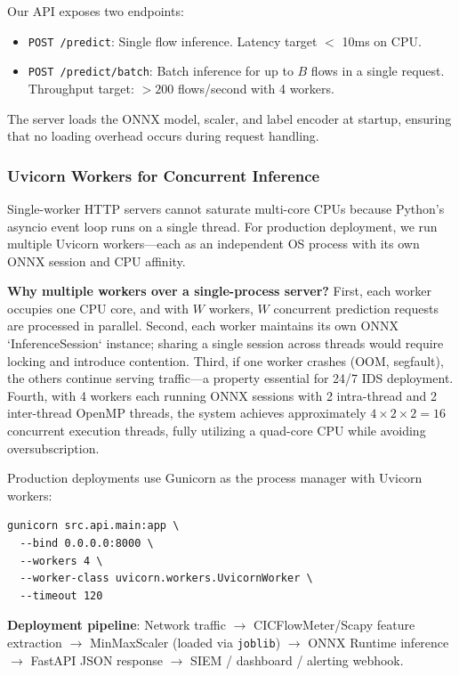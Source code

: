\documentclass[conference]{IEEEtran}
\begin{document}
Our API exposes two endpoints:
\begin{itemize}
    \item \texttt{POST /predict}: Single flow inference. Latency target $<$ 10ms on CPU.
    \item \texttt{POST /predict/batch}: Batch inference for up to $B$ flows in a single request. Throughput target: $>200$ flows/second with 4 workers.
\end{itemize}

The server loads the ONNX model, scaler, and label encoder at startup, ensuring that no loading overhead occurs during request handling.

\subsubsection{Uvicorn Workers for Concurrent Inference}

Single-worker HTTP servers cannot saturate multi-core CPUs because Python's asyncio event loop runs on a single thread. For production deployment, we run multiple Uvicorn workers---each as an independent OS process with its own ONNX session and CPU affinity.

\textbf{Why multiple workers over a single-process server?} First, each worker occupies one CPU core, and with $W$ workers, $W$ concurrent prediction requests are processed in parallel. Second, each worker maintains its own ONNX `InferenceSession` instance; sharing a single session across threads would require locking and introduce contention. Third, if one worker crashes (OOM, segfault), the others continue serving traffic---a property essential for 24/7 IDS deployment. Fourth, with 4 workers each running ONNX sessions with 2 intra-thread and 2 inter-thread OpenMP threads, the system achieves approximately $4 \times 2 \times 2 = 16$ concurrent execution threads, fully utilizing a quad-core CPU while avoiding oversubscription.

Production deployments use Gunicorn as the process manager with Uvicorn workers:
\begin{verbatim}
gunicorn src.api.main:app \
  --bind 0.0.0.0:8000 \
  --workers 4 \
  --worker-class uvicorn.workers.UvicornWorker \
  --timeout 120
\end{verbatim}

\textbf{Deployment pipeline}: Network traffic $\rightarrow$ CICFlowMeter/Scapy feature extraction $\rightarrow$ MinMaxScaler (loaded via \texttt{joblib}) $\rightarrow$ ONNX Runtime inference $\rightarrow$ FastAPI JSON response $\rightarrow$ SIEM / dashboard / alerting webhook.
\end{document}
